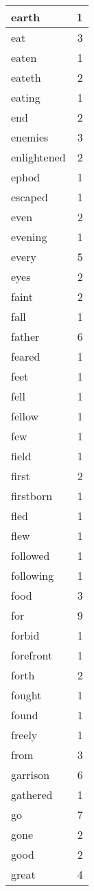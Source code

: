 \begin{center}
\begin{longtable}{l|r}
earth & 1 \\ \hline
eat & 3 \\ \hline
eaten & 1 \\ \hline
eateth & 2 \\ \hline
eating & 1 \\ \hline
end & 2 \\ \hline
enemies & 3 \\ \hline
enlightened & 2 \\ \hline
ephod & 1 \\ \hline
escaped & 1 \\ \hline
even & 2 \\ \hline
evening & 1 \\ \hline
every & 5 \\ \hline
eyes & 2 \\ \hline
faint & 2 \\ \hline
fall & 1 \\ \hline
father & 6 \\ \hline
feared & 1 \\ \hline
feet & 1 \\ \hline
fell & 1 \\ \hline
fellow & 1 \\ \hline
few & 1 \\ \hline
field & 1 \\ \hline
first & 2 \\ \hline
firstborn & 1 \\ \hline
fled & 1 \\ \hline
flew & 1 \\ \hline
followed & 1 \\ \hline
following & 1 \\ \hline
food & 3 \\ \hline
for & 9 \\ \hline
forbid & 1 \\ \hline
forefront & 1 \\ \hline
forth & 2 \\ \hline
fought & 1 \\ \hline
found & 1 \\ \hline
freely & 1 \\ \hline
from & 3 \\ \hline
garrison & 6 \\ \hline
gathered & 1 \\ \hline
go & 7 \\ \hline
gone & 2 \\ \hline
good & 2 \\ \hline
great & 4 \\ \hline

\end{longtable}
\end{center}
